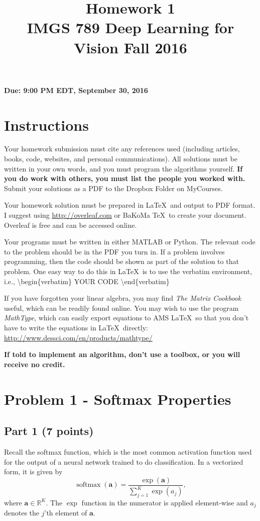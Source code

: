 \documentclass[11pt, oneside]{article}   	%
\title{Homework 1 \\ IMGS 789 Deep Learning for Vision Fall 2016}
\date{}
\begin{document}
\maketitle

\textbf{Due: 9:00 PM EDT, September 30, 2016}

\section*{Instructions}

Your homework submission must cite any references used (including articles, books, code, websites, and personal communications).  All solutions must be written in your own words, and you must program the algorithms yourself. \textbf{If you do work with others, you must list the people you worked with.} Submit your solutions as a PDF to the Dropbox Folder on MyCourses.

Your homework solution must be prepared in \LaTeX \, and output to PDF format. I suggest using \url{http://overleaf.com} or BaKoMa \TeX \,  to create your document. Overleaf is free and can be accessed online.

Your programs must be written in either MATLAB or Python. The relevant code to the problem should be in the PDF you turn in. If a problem involves programming, then the code should be shown as part of the solution to that problem. One easy way to do this in \LaTeX \, is to use the verbatim environment, i.e., \textbackslash begin\{verbatim\} YOUR CODE \textbackslash end\{verbatim\}

If you have forgotten your linear algebra, you may find  \textit{The Matrix Cookbook} useful, which can be readily found online. You may wish to use the program \textit{MathType}, which can easily export equations to AMS \LaTeX \, so that you don't have to write the equations in \LaTeX \, directly: \url{http://www.dessci.com/en/products/mathtype/}

\sloppy
\textbf{If told to implement an algorithm, don't use a toolbox, or you will receive no credit.}


\section*{Problem 1 - Softmax Properties}

\subsection*{Part 1 (7 points)}
Recall the softmax function, which is the most common activation function used for the output of a neural network trained to do classification. In a vectorized form, it is given by
\begin{equation*}
\operatorname{softmax} \left( {\mathbf{a}} \right) = \frac{{\exp \left( {\mathbf{a}} \right)}}
{{\sum\nolimits_{j = 1}^K {\exp \left( {a_j } \right)} }},
\end{equation*}
where $\mathbf{a}\in \mathbb{R}^K$. The $\exp$ function in the numerator is applied element-wise and $a_j$ denotes the $j$'th element of $\mathbf{a}$.
\end{document}
